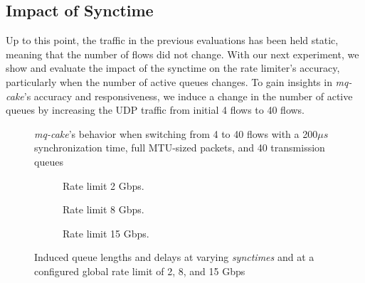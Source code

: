 \subsection{Impact of Synctime}\label{sec:synchronization-time}
Up to this point, the traffic in the previous evaluations has been held static, meaning that the number of flows did not change.
%
With our next experiment, we show and evaluate the impact of the synctime on the rate limiter's accuracy, particularly when the number of active queues changes.
%
To gain insights in \textit{mq-cake}'s accuracy and responsiveness, we induce a change in the number of active queues by increasing the UDP traffic from initial 4 flows to 40 flows.
%

%
\begin{figure}
    \centering
    
    \caption{\textit{mq-cake}'s behavior when switching from 4 to 40 flows with a 200$\mu s$ synchronization time, full MTU-sized packets, and 40 transmission queues}\label{fig:switching_200us}
\end{figure}
%
\begin{figure*}
    \begin{subfigure}{0.3\linewidth}
        \centering
        
        \caption{Rate limit 2 Gbps.}\label{fig:qlen_qdel_200us_2}
    \end{subfigure}
    \hfill
    \begin{subfigure}{0.3\linewidth}
        \centering
        
        \caption{Rate limit 8 Gbps.}\label{fig:qlen_qdel_200us_8}
    \end{subfigure}
    \hfill
    \begin{subfigure}{0.3\linewidth}
        \centering
        
        \caption{Rate limit 15 Gbps.}\label{fig:qlen_qdel_200us_15}
    \end{subfigure}
    \caption{Induced queue lengths and delays at varying \textit{synctimes} and at a configured global rate limit of 2, 8, and 15 Gbps}\label{fig:qlen_qdel}
\end{figure*}

